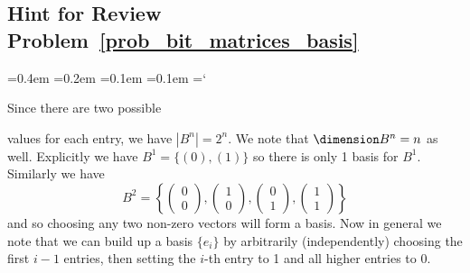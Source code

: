 
\subsection*{Hint for Review Problem~\ref{prob_bit_matrices_basis}}

{\ttfamily
{}\font=0.4em
\font=0.2em
\font=0.1em
\font=0.1em
\hyphenchar\font=`\-


\hypertarget{scripts_basis_and_dimension_hint}{Since there are two possible} values for each entry, we have $|B^n| = 2^n$. We note that $\dimension B^n = n$ as well. Explicitly we have $B^1 = \{ (0), (1) \}$ so there is only 1 basis for $B^1$. Similarly we have
\[
B^2 = \left\{
\begin{pmatrix} 0 \\ 0 \end{pmatrix},
\begin{pmatrix} 1 \\ 0 \end{pmatrix},
\begin{pmatrix} 0 \\ 1 \end{pmatrix},
\begin{pmatrix} 1 \\ 1 \end{pmatrix}
\right\}
\]
and so choosing any two non-zero vectors will form a basis. Now in general we note that we can build up a basis $\{ e_i \}$ by arbitrarily (independently) choosing the first $i-1$ entries, then setting the $i$-th entry to 1 and all higher entries to 0.

} %

